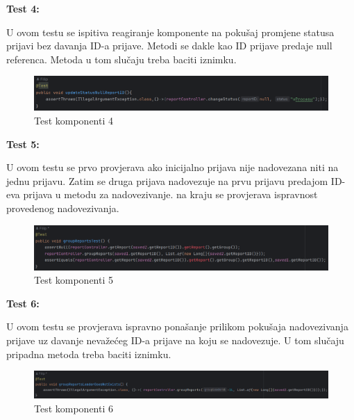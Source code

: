 			\textbf{Test 4:}
			
			U ovom testu se ispitiva reagiranje komponente na pokušaj promjene statusa prijavi bez davanja ID-a prijave. Metodi se dakle kao ID prijave predaje null referenca. Metoda u tom slučaju treba baciti iznimku.
			
			\begin{figure}[H]
				\includegraphics[width=\textwidth]{slike/JUnitTest4.png} %
				\caption{Test komponenti 4}
				\label{fig:JUnitTest4} %
			\end{figure}
			
			\textbf{Test 5:}
			
			U ovom testu se prvo provjerava ako inicijalno prijava nije nadovezana niti na jednu prijavu. Zatim se druga prijava nadovezuje na prvu prijavu predajom ID-eva prijava u metodu za nadovezivanje. na kraju se provjerava ispravnost provedenog nadovezivanja.
			
			\begin{figure}[H]
				\includegraphics[width=\textwidth]{slike/JUnitTest5.png} %
				\caption{Test komponenti 5}
				\label{fig:JUnitTest5} %
			\end{figure}
			
			\textbf{Test 6:}
			
			U ovom testu se provjerava ispravno ponašanje prilikom pokušaja nadovezivanja prijave uz davanje nevažećeg ID-a prijave na koju se nadovezuje. U tom slučaju pripadna metoda treba baciti iznimku.
			
			\begin{figure}[H]
				\includegraphics[width=\textwidth]{slike/JUnitTest6.png} %
				\caption{Test komponenti 6}
				\label{fig:JUnitTest6} %
			\end{figure}
			
